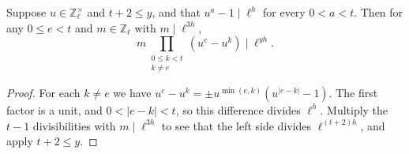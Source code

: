 \begin{lemma}
\label{lem:c-triangle-power-differences}
\emitthmsource
Suppose $u\in\mathbb Z_\ell^\times$ and $t+2\le y$, and that $u^a-1\mid\ell^h$ for every $0<a<t$. Then for any $0\le e<t$ and $m\in\mathbb Z_\ell$ with $m\mid\ell^{3h}$,
\[
 m\prod_{\substack{0\le k<t\\k\ne e}}(u^e-u^k)\mid\ell^{yh}.
\]
\end{lemma}
\begin{proof}
For each $k\ne e$ we have $u^e-u^k=\pm u^{\min(e,k)}(u^{|e-k|}-1)$. The first factor is a unit, and $0<|e-k|<t$, so this difference divides $\ell^h$. Multiply the $t-1$ divisibilities with $m\mid\ell^{3h}$ to see that the left side divides $\ell^{(t+2)h}$, and apply $t+2\le y$.
\end{proof}

